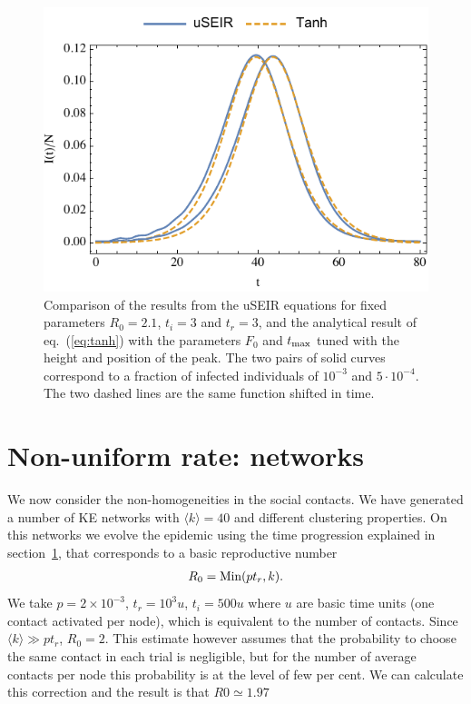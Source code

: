 \documentclass[a4paper,oneside,11pt]{article}
\begin{document}
\begin{figure}[h!]
  \centering
  \includegraphics[width=12cm]{logistica.pdf}
  \caption{Comparison of the results from the uSEIR equations for fixed parameters $R_0=2.1$, $t_i=3$ and $t_r=3$, and the analytical result of  eq.~(\ref{eq:tanh}) with the parameters $F_0$ and $t_{\rm max}$ tuned with the height and position of the peak. The two pairs of solid curves correspond to a fraction of infected individuals of $10^{-3}$ and $5\cdot 10^{-4}$. The two dashed lines are the same function shifted in time.}
  \label{fig:logistic}
   \end{figure}

 \section{Non-uniform rate: networks  }
\label{sec:net}

We now consider the non-homogeneities in the social contacts. 
We have generated a number of KE networks with $\langle k \rangle = 40$ and different clustering properties. On this networks we evolve the epidemic using the time progression explained in section~\ref{sec:net}, that corresponds to a basic reproductive number
\begin{eqnarray}
R_0 = {\rm Min}(p t_r, k). 
\end{eqnarray}
We take $p=2 \times 10^{-3}$, $t_r= 10^3 u$, $t_i=500 u$ where $u$ are  basic time units (one contact activated per node), which is equivalent to the number of contacts. Since  $\langle k \rangle \gg p t_r$, $R_0 = 2$.
This estimate however assumes that the probability to choose the same contact in each trial is negligible, but for the number of average contacts per node this probability is at the level of few per cent. We can calculate this correction and the result is that $R0 \simeq 1.97$
\end{document}
